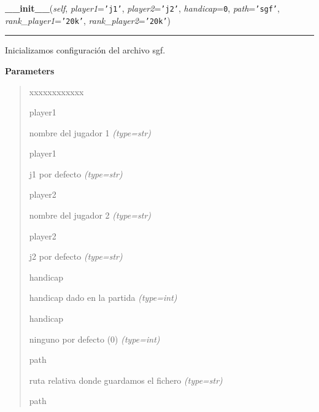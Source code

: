 \hspace{.8\funcindent}\begin{boxedminipage}{\funcwidth}

    \raggedright \textbf{\_\_init\_\_}(\textit{self}, \textit{player1}={\tt \texttt{'}\texttt{j1}\texttt{'}}, \textit{player2}={\tt \texttt{'}\texttt{j2}\texttt{'}}, \textit{handicap}={\tt 0}, \textit{path}={\tt \texttt{'}\texttt{sgf}\texttt{'}}, \textit{rank\_player1}={\tt \texttt{'}\texttt{20k}\texttt{'}}, \textit{rank\_player2}={\tt \texttt{'}\texttt{20k}\texttt{'}})

    \vspace{-1.5ex}

    \rule{\textwidth}{0.5\fboxrule}
\setlength{\parskip}{2ex}
Inicializamos configuración del archivo sgf.

\setlength{\parskip}{1ex}
      \textbf{Parameters}
      \vspace{-1ex}

      \begin{quote}
        \begin{Ventry}{xxxxxxxxxxxx}

          \item[player1]


nombre del jugador 1
            {\it (type=str)}

          \item[player1]


j1 por defecto
            {\it (type=str)}

          \item[player2]


nombre del jugador 2
            {\it (type=str)}

          \item[player2]


j2 por defecto
            {\it (type=str)}

          \item[handicap]


handicap dado en la partida
            {\it (type=int)}

          \item[handicap]


ninguno por defecto (0)
            {\it (type=int)}

          \item[path]


ruta relativa donde guardamos el fichero
            {\it (type=str)}

          \item[path]



\end{Ventry}
\end{quote}
\end{boxedminipage}
